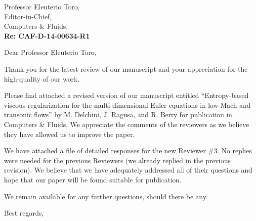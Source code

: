\begin{letter}{Professor Eleuterio Toro, \\  Editor-in-Chief,\\
    Computers \& Fluids,\\
\textbf{Re: CAF-D-14-00634-R1}}


\date{\today}

\opening{Dear Professor Eleuterio Toro,}
         \vspace{0.25cm}

Thank you for the latest review of our manuscript and your appreciation for the high-quality of our work.

Please find attached  a revised version of our manuscript entitled
``Entropy-based viscous regularization for the multi-dimensional Euler equations in low-Mach and transonic flows''
by M. Delchini, J. Ragusa, and R. Berry for
publication in Computers \& Fluids. We appreciate the comments of the reviewers as we
believe they have allowed us to improve the paper.

We have attached a file of detailed responses for the new Reviewer \#3.
No replies were needed for the previous Reviewers (we already replied in the previous revision). 
We believe that we have adequately addressed all of their questions and hope that our paper will be found suitable for publication.

%
%
\bigskip

We remain available for any further questions, should there be any.



\closing{Best regards, }

\end{letter}



